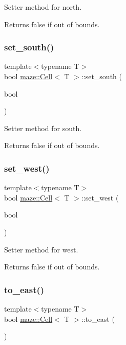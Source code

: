 Setter method for north. 

Returns false if out of bounds. \mbox{\label{classmaze_1_1Cell_ac42f810920a1c85ec3600ebcc16cdec9}} 
\subsubsection{\texorpdfstring{set\+\_\+south()}{set\_south()}}
{\footnotesize\ttfamily template$<$typename T$>$ \\
bool \hyperlink{classmaze_1_1Cell}{maze\+::\+Cell}$<$ T $>$\+::set\+\_\+south (\begin{DoxyParamCaption}\item[{bool}]{ }\end{DoxyParamCaption})}



Setter method for south. 

Returns false if out of bounds. \mbox{\label{classmaze_1_1Cell_a7b0d55a391d32b61abe0cc411a2c5efc}} 
\subsubsection{\texorpdfstring{set\+\_\+west()}{set\_west()}}
{\footnotesize\ttfamily template$<$typename T$>$ \\
bool \hyperlink{classmaze_1_1Cell}{maze\+::\+Cell}$<$ T $>$\+::set\+\_\+west (\begin{DoxyParamCaption}\item[{bool}]{ }\end{DoxyParamCaption})}



Setter method for west. 

Returns false if out of bounds. \mbox{\label{classmaze_1_1Cell_a995ff6967a9fe6a8ece294172b6c1d9d}} 
\subsubsection{\texorpdfstring{to\+\_\+east()}{to\_east()}}
{\footnotesize\ttfamily template$<$typename T$>$ \\
bool \hyperlink{classmaze_1_1Cell}{maze\+::\+Cell}$<$ T $>$\+::to\+\_\+east (\begin{DoxyParamCaption}{ }\end{DoxyParamCaption})}



